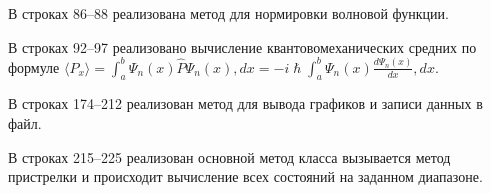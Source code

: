 В строках 86--88 реализована метод для нормировки волновой функции.


В строках 92--97 реализовано вычисление квантовомеханических средних по формуле
$\langle P_x \rangle = \int_{a}^{b}\Psi_n(x)\hat{P}\Psi_n(x),dx = -i \hslash\int_{a}^{b}\Psi_n(x)\frac{d\Psi_n(x)}{dx},dx$.


В строках 174--212 реализован метод для вывода графиков и записи данных в файл.


В строках 215--225 реализован основной метод класса вызывается метод пристрелки и происходит вычисление всех состояний на заданном диапазоне.


\newpage